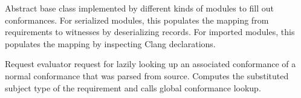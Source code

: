 \documentclass[../generics]{subfiles}
\begin{document}
Abstract base class implemented by different kinds of modules to fill out conformances. For serialized modules, this populates the mapping from requirements to witnesses by deserializing records. For imported modules, this populates the mapping by inspecting Clang declarations.

Request evaluator request for lazily looking up an associated conformance of a normal conformance that was parsed from source. Computes the substituted subject type of the requirement and calls global conformance lookup.
\end{document}
